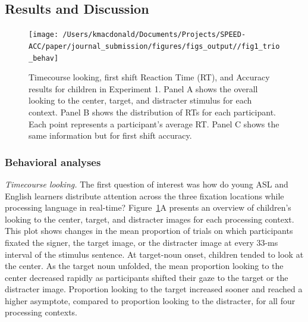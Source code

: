 \documentclass[english,floatsintext,man]{apa6}
\begin{document}
\hypertarget{results-and-discussion}{%
\subsection{Results and Discussion}\label{results-and-discussion}}

\begin{figure}[!t]

{\centering \texttt{[image: /Users/kmacdonald/Documents/Projects/SPEED-ACC/paper/journal\_submission/figures/figs\_output//fig1\_trio\_behav]} 

}

\caption{Timecourse looking, first shift Reaction Time (RT), and Accuracy results for children in Experiment 1. Panel A shows the overall looking to the center, target, and distracter stimulus for each context. Panel B shows the distribution of RTs for each participant. Each point represents a participant's average RT. Panel C shows the same information but for first shift accuracy.}\label{fig:speed-acc-trio-plot}
\end{figure}

\hypertarget{behavioral-analyses}{%
\subsubsection{Behavioral analyses}\label{behavioral-analyses}}

\emph{Timecourse looking.} The first question of interest was how do
young ASL and English learners distribute attention across the three
fixation locations while processing language in real-time?
Figure~\ref{fig:speed-acc-trio-plot}A presents an overview of children's
looking to the center, target, and distracter images for each processing
context. This plot shows changes in the mean proportion of trials on
which participants fixated the signer, the target image, or the
distracter image at every 33-ms interval of the stimulus sentence. At
target-noun onset, children tended to look at the center. As the target
noun unfolded, the mean proportion looking to the center decreased
rapidly as participants shifted their gaze to the target or the
distracter image. Proportion looking to the target increased sooner and
reached a higher asymptote, compared to proportion looking to the
distracter, for all four processing contexts.
\end{document}

